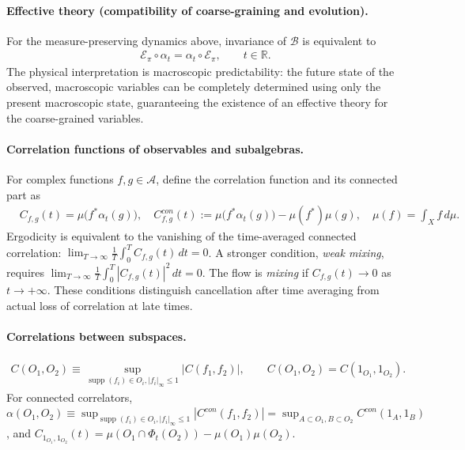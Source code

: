 \documentclass[a4paper,11pt]{article}
\theoremstyle{definition}
\theoremstyle{remark}
\newcommand{\mA}{\mathcal{A}}
\newcommand{\mB}{\mathcal{B}}
\newcommand{\mE}{\mathcal{E}}
\begin{document}
\paragraph{Effective theory (compatibility of coarse-graining and evolution).}
For the measure-preserving dynamics above, invariance of $\mB$ is equivalent to
\begin{align}\label{eq:classical-expectation-equivariance}
    \mE_{\pi}\circ\alpha_t=\alpha_t\circ \mE_{\pi},\qquad t\in\mathbb{R}.
\end{align}
The physical interpretation is macroscopic predictability: the future state of the
observed, macroscopic variables can be completely determined using only the present
macroscopic state, guaranteeing the existence of an effective theory for the
coarse-grained variables.
 
\paragraph{Correlation functions of observables and subalgebras.}
For complex functions $f,g\in\mA$, define the correlation function and its connected
part as
\begin{align}
    &C_{f,g}(t)=\mu\bigl(f^*\alpha_t(g)\bigr),\quad
    C^{con}_{f,g}(t)
    :=\mu\bigl(f^*\alpha_t(g)\bigr)-\mu(f^*)\mu(g),\quad
    \mu(f)=\int_X f\,d\mu.
\end{align}
Ergodicity is equivalent to the vanishing of the time-averaged connected correlation:
$\lim_{T\to\infty}\frac{1}{T}\int_0^T C_{f,g}(t)\,dt=0$.  A stronger condition,
\emph{weak mixing}, requires
$\lim_{T\to\infty}\frac{1}{T}\int_0^T |C_{f,g}(t)|^2\,dt=0$.  The flow is
\emph{mixing} if $C_{f,g}(t)\to0$ as $t\to+\infty$.  These conditions distinguish
cancellation after time averaging from actual loss of correlation at late times.
 
\paragraph{Correlations between subspaces.}
\begin{align}
    C(O_1,O_2)\equiv \sup_{\operatorname{supp}(f_i)\in O_i,|f_i|_\infty\leq 1}|C(f_1,f_2)|,\qquad
    C(O_1,O_2)=C(1_{O_1},1_{O_2}).
\end{align}
For connected correlators,
$\alpha(O_1,O_2)\equiv\sup_{\operatorname{supp}(f_i)\in O_i,|f_i|_\infty\leq1}|C^{con}(f_1,f_2)|
=\sup_{A\subset O_1,B\subset O_2}C^{con}(1_A,1_B)$, and
$C_{1_{O_1},1_{O_2}}(t)=\mu(O_1\cap\Phi_t(O_2))-\mu(O_1)\mu(O_2)$.
 
\end{document}
